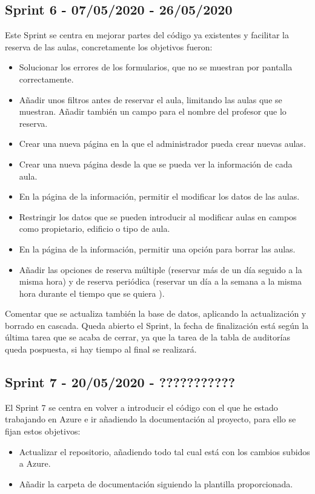 \subsection{Sprint 6 - 07/05/2020 - 26/05/2020}
Este Sprint se centra en mejorar partes del código ya existentes y facilitar la reserva de las aulas, concretamente los objetivos fueron:
\begin{itemize}
    \item Solucionar los errores de los formularios, que no se muestran por pantalla correctamente.
    \item Añadir unos filtros antes de reservar el aula, limitando las aulas que se muestran. Añadir también un campo para el nombre del profesor que lo reserva.
    \item Crear una nueva página en la que el administrador pueda crear nuevas aulas.
    \item Crear una nueva página desde la que se pueda ver la información de cada aula.
    \item En la página de la información, permitir el modificar los datos de las aulas.
    \item Restringir los datos que se pueden introducir al modificar aulas en campos como propietario, edificio o tipo de aula.
    \item En la página de la información, permitir una opción para borrar las aulas.
    \item Añadir las opciones de reserva múltiple (reservar más de un día seguido a la misma hora) y de reserva periódica (reservar un día a la semana a la misma hora durante el tiempo que se quiera ).
\end{itemize}
Comentar que se actualiza también la base de datos, aplicando la actualización y borrado en cascada.
Queda abierto el Sprint, la fecha de finalización está según la última tarea que se acaba de cerrar, ya que la tarea de la tabla de auditorías queda pospuesta, si hay tiempo al final se realizará.

\subsection{Sprint 7 - 20/05/2020 - ???????????}
El Sprint 7 se centra en volver a introducir el código con el que he estado trabajando en Azure e ir añadiendo la documentación al proyecto, para ello se fijan estos objetivos:
\begin{itemize}
    \item Actualizar el repositorio, añadiendo todo tal cual está con los cambios subidos a Azure.
    \item Añadir la carpeta de documentación siguiendo la plantilla proporcionada.
\end{itemize}


